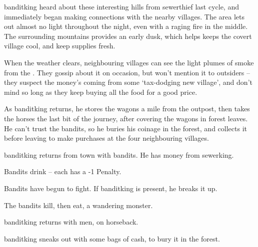 \begin{multicols}{2}

\begin{exampletext}
  \noindent
  \Gls{banditking} heard about these interesting hills from \gls{sewerthief} last \gls{cycle}, and immediately began making connections with the nearby \glspl{village}.
  The area lets out almost no light throughout the night, even with a raging fire in the middle.
  The surrounding mountains provides an early dusk, which helps keeps the covert \gls{village} cool, and keep supplies fresh.
\end{exampletext}

When the weather clears, neighbouring \glspl{village} can see the light plumes of smoke from the .
They gossip about it on occasion, but won't mention it to outsiders -- they suspect the money's coming from some `tax-dodging new \gls{village}', and don't mind so long as they keep buying all the food for a good price.

As \gls{banditking} returns, he stores the wagons a mile from the outpost, then takes the horses the last bit of the journey, after covering the wagons in forest leaves.
He can't trust the bandits, so he buries his coinage in the forest, and collects it before leaving to make purchases at the four neighbouring \glspl{village}.

\begin{dlist}
  \item
  \Gls{banditking} returns from \gls{town} with  bandits.
  He has money from \gls{sewerking}.
  \item
  Bandits drink -- each has a -1 Penalty.
  \item
  Bandits have begun to fight.
  If \gls{banditking} is present, he breaks it up.
  \item
  The bandits kill, then eat, a wandering monster.
  \item
  \Gls{banditking} returns with  men, on horseback.
  \item
  \Gls{banditking} sneaks out with some bags of cash, to bury it in the forest.
\end{dlist}

\end{multicols}
